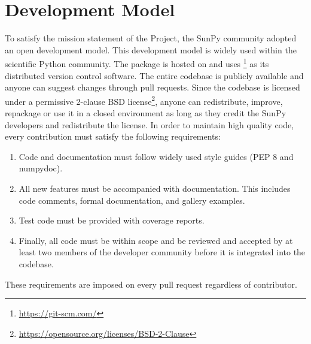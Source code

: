 \section{Development Model}
\label{sec:development}

To satisfy the mission statement of the Project, the SunPy community adopted an open development model.
This development model is widely used within the scientific Python community.
The \sunpypkg package is hosted on \github and uses \footnote{\url{https://git-scm.com/}} as its distributed version control software.
The entire codebase is publicly available and anyone can suggest changes through pull requests.
Since the codebase is licensed under a permissive 2-clause BSD license\footnote{\url{https://opensource.org/licenses/BSD-2-Clause}}, anyone can redistribute, improve, repackage or use it in a closed environment as long as they credit the SunPy developers and redistribute the license.
In order to maintain high quality code, every contribution must satisfy the following requirements:
\begin{enumerate}
    \item Code and documentation must follow widely used style guides (PEP 8 and numpydoc).
    \item All new features must be accompanied with documentation.
    This includes code comments, formal documentation, and gallery examples.
    \item Test code must be provided with coverage reports.
    \item Finally, all code must be within scope and be reviewed and accepted by at least two members of the developer community before it is integrated into the codebase.
\end{enumerate}
These requirements are imposed on every pull request regardless of contributor.

